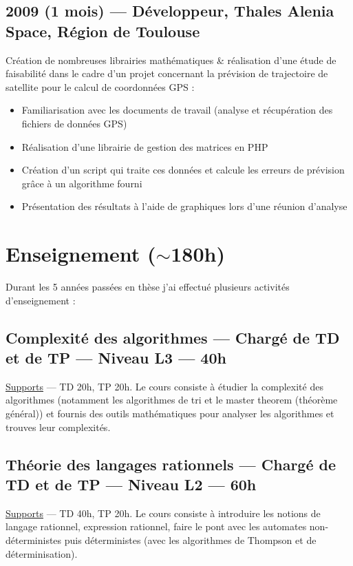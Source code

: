 \documentclass[11pt,a4paper,sans]{article} %
\begin{document}
\subsection{2009 (1 mois) --- Développeur, Thales Alenia Space, Région de Toulouse}
Création de nombreuses librairies mathématiques \& réalisation d'une étude de faisabilité dans le cadre d'un projet
concernant la prévision de trajectoire de satellite pour le calcul de coordonnées GPS :
\begin{itemize}
  \item Familiarisation avec les documents de travail (analyse et récupération des fichiers de données GPS)
  \item Réalisation d'une librairie de gestion des matrices en PHP
  \item Création d'un script qui traite ces données et calcule les erreurs de prévision grâce à un algorithme fourni
  \item Présentation des résultats à l'aide de graphiques lors d'une réunion d'analyse
\end{itemize}


\section{Enseignement (\(\sim\)180h)}

Durant les 5 années passées en thèse j'ai effectué plusieurs activités d'enseignement :

\subsection{Complexité des algorithmes --- Chargé de TD et de TP --- Niveau L3 --- 40h}

\href{https://www.lrde.epita.fr/~adl/ens/cpxa}{Supports} --- TD 20h, TP 20h. Le  cours consiste à étudier la
complexité des algorithmes (notamment les algorithmes de tri et le master theorem (théorème général)) et fournis des
outils mathématiques pour analyser les algorithmes et trouves leur complexités.

\subsection{Théorie des langages rationnels --- Chargé de TD et de TP --- Niveau L2 --- 60h}

\href{http://jo.fabrizio.free.fr/teaching/thlr/}{Supports} --- TD 40h, TP 20h. Le cours consiste à introduire les
notions de langage rationnel, expression rationnel, faire le pont avec les automates non-déterministes puis
déterministes (avec les algorithmes de Thompson et de déterminisation).
\end{document}
